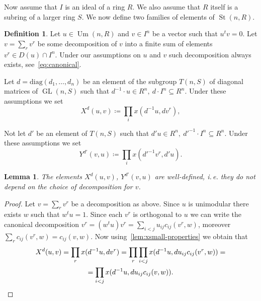 \documentclass[oneside, 10pt]{amsart}
\DeclareMathOperator{\St}{St}
\DeclareMathOperator{\GL}{GL}
\DeclareMathOperator{\Um}{Um}
\numberwithin{equation}{section}
\numberwithin{thm}{section}
\newtheorem{lemma}[thm]{Lemma}
\numberwithin{lemma}{section}
\theoremstyle{definition}
\newtheorem{dfn}[lemma]{Definition}
\theoremstyle{remark}
\begin{document}
Now assume that $I$ is an ideal of a ring $R$.
We also assume that $R$ itself is a subring of a larger ring $S$.
We now define two families of elements of $\St(n, R)$.
\begin{dfn} \label{dfn:xy-def}
Let $u \in \Um(n, R)$ and $v \in I^n$ be a vector such that $u^{t}v = 0$.
Let $v = \sum_r v^r$ be some decomposition of $v$ into a finite sum of elements $v^r \in D(u) \cap I^n$.
Under our assumptions on $u$ and $v$ such decomposition always exists, see~\eqref{eq:canonical}.

Let $d = \mathrm{diag}(d_1, \ldots, d_n)$ be an element of the subgroup $T(n, S)$ of diagonal matrices of $\GL(n, S)$ such that
$d^{-1} \cdot u \in R^n,\ d \cdot I^n \subseteq R^n.$
Under these assumptions we set
\begin{equation} \label{eq:X-def}
X^d(u, v) \coloneqq \prod_i x(d^{-1}u, dv^r),
\end{equation}

Not let $d'$ be an element of $T(n, S)$ such that $d' u\in R^n,\ {d'}^{-1} \cdot I^n \subseteq R^n$.
Under these assumptions we set
\begin{equation} \label{eq:Y-def}
Y^{d'}(v, u) \coloneqq \prod_i x({d'}^{-1} v^r, {d'}u).
\end{equation}
\end{dfn}

\begin{lemma}
\label{lem:xy-wd}
The elements $X^d(u, v)$, $Y^{d'}(v, u)$ are well-defined, i.\,e. they do not depend on the choice of decomposition for $v$.
\end{lemma}
\begin{proof}
Let $v = \sum_r v^r$ be a decomposition as above.
Since $u$ is unimodular there exists $w$ such that $w^t u = 1$.
Since each $v^r$ is orthogonal to $u$ we can write the canonical decomposition
$v^r = (w^tu)v^r = \sum_{i<j} u_{ij} c_{ij}(v^r, w)$, moreover $\sum_{r} c_{ij}(v^r, w) = c_{ij}(v, w)$.
Now using~\cref{lem:xsmall-properties} we obtain that
\begin{multline*}
X^d(u, v) =
\prod\limits_r x(d^{-1}u, dv^r) = \prod\limits_{r}\prod\limits_{i<j} x(d^{-1} u, du_{ij}c_{ij}(v^r, w)) = \\ =
\prod\limits_{i<j} x(d^{-1} u, d u_{ij}c_{ij}(v, w)). \qedhere
\end{multline*}
\end{proof}
\end{document}
